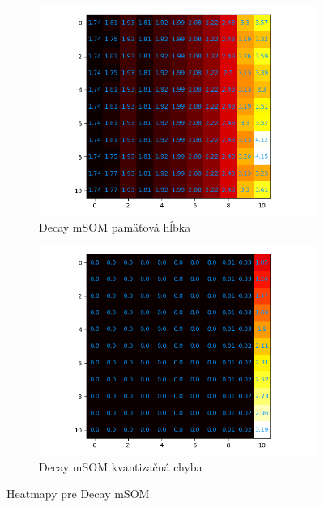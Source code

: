 \begin{figure}[H]
    \centering
    \begin{subfigure}{.5\textwidth}
        \centering
        \includegraphics[width=\linewidth]{assets/decay_msom_memory_span}
        \caption{Decay mSOM pamäťová hĺbka}
        \label{fig:sub1}
    \end{subfigure}%
    \begin{subfigure}{.5\textwidth}
        \centering
        \includegraphics[width=\linewidth]{assets/decay_msom_quantization_errors}
        \caption{Decay mSOM kvantizačná chyba}
        \label{fig:sub2}
    \end{subfigure}
    \caption{Heatmapy pre Decay mSOM}
    \label{fig:test}
\end{figure}
    
